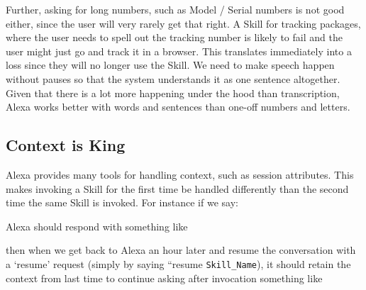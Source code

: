 Further, asking for long numbers, such as Model / Serial numbers is not good either, since the user will very rarely get that right. A Skill for tracking packages, where the user needs to spell out the tracking number is likely to fail and the user might just go and track it in a browser. This translates immediately into a loss since they will no longer use the Skill. We need to make speech happen without pauses so that the system understands it as one sentence altogether. Given that there is a lot more happening under the hood than transcription, Alexa works better with words and sentences than one-off numbers and letters. 

\subsection*{Context is King}
Alexa provides many tools for handling context, such as session attributes. This makes invoking a Skill for the first time be handled differently than the second time the same Skill is invoked. For instance if we say:




\noindent Alexa should respond with something like

\begin{flushright}
\end{flushright}



\noindent then when we get back to Alexa an hour later and resume the conversation with a `resume' request (simply by saying ``resume \texttt{Skill_Name}), it should retain the context from last time to continue asking after invocation something like

